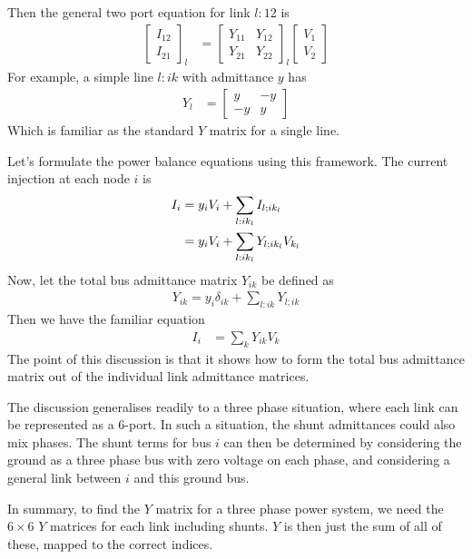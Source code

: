 \documentclass[11pt]{article}
\begin{document}
Then the general two port equation for link $l:12$ is
\begin{align}
	\begin{bmatrix}
		I_{12} \\
		I_{21}
	\end{bmatrix}_l
	&=
	\begin{bmatrix}
		Y_{11} & Y_{12} \\
		Y_{21} & Y_{22}
	\end{bmatrix}_l
		\begin{bmatrix}
		V_1 \\
		V_2
	\end{bmatrix}
\end{align}
For example, a simple line $l:ik$ with admittance $y$ has
\begin{align}
	Y_l &=
	\begin{bmatrix}
		y & -y \\ -y & y
	\end{bmatrix}
\end{align}
Which is familiar as the standard $Y$ matrix for a single line.

Let's formulate the power balance equations using this framework. The current injection at each node $i$ is
\begin{align}
I_i &= y_iV_i + \sum_{l:ik_l} I_{l;ik_l} \notag \\
&=  y_iV_i + \sum_{l:ik_l} Y_{l;ik_l}V_{k_l}
\end{align}
Now, let the total bus admittance matrix $Y_{ik}$ be defined as
\begin{align}
	Y_{ik} = y_i\delta_{ik} + \sum_{l:ik}Y_{l;ik}
\end{align}
Then we have the familiar equation
\begin{align}
	I_i &= \sum_k Y_{ik}V_k
\end{align}
 The point of this discussion is that it shows how to form the total bus admittance matrix out of the individual link admittance matrices.

The discussion generalises readily to a three phase situation, where each link can be represented as a 6-port. In such a situation, the shunt admittances could also mix phases. The shunt terms for bus $i$ can then be determined by considering the ground as a three phase bus with zero voltage on each phase, and considering a general link between $i$ and this ground bus.

In summary, to find the $Y$ matrix for a three phase power system, we need the $6\times6$ $Y$ matrices for each link including shunts. $Y$ is then just the sum of all of these, mapped to the correct indices.
\end{document}
